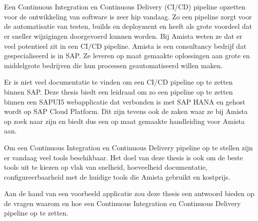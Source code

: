 
\chapter{}
\label{ch:inleiding}

Een Continuous Integration en Continuous Delivery (CI/CD) pipeline opzetten voor de ontwikkeling van software is zeer hip vandaag. Zo een pipeline zorgt voor de automatisatie van testen, builds en deployment en heeft als grote voordeel dat er sneller wijzigingen doorgevoerd kunnen worden. Bij Amista weten ze dat er veel potentieel zit in een CI/CD pipeline. Amista is een consultancy bedrijf dat gespecialiseerd is in SAP. Ze leveren op maat gemaakte oplossingen aan grote en middelgrote bedrijven die hun processen geautomatiseerd willen maken. 

Er is niet veel documentatie te vinden om een CI/CD pipeline op te zetten binnen SAP.
Deze thesis biedt een leidraad om zo een pipeline op te zetten binnen een SAPUI5 webapplicatie dat verbonden is met SAP HANA en gehost wordt op SAP Cloud Platform. 
Dit zijn tevens ook de zaken waar ze bij Amista op zoek naar zijn en biedt dus een op maat gemaakte handleiding voor Amista aan.

Om een Continuous Integration en Continuous Delivery pipeline op te stellen zijn er vandaag veel tools beschikbaar.
Het doel van deze thesis is ook om de beste tools uit te kiezen op vlak van snelheid, hoeveelheid documentatie, configureerbaarheid met de huidige tools die Amista gebruikt en kostprijs.

Aan de hand van een voorbeeld applicatie zou deze thesis een antwoord bieden op de vragen waarom en hoe een Continuous Integration en Continuous Delivery pipeline op te zetten.



%

